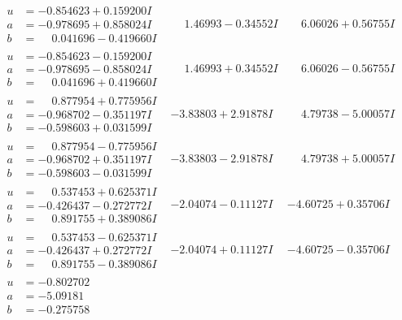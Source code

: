 \documentclass[1p]{elsarticle_modified}
\theoremstyle{definition}
\begin{document}
$$\begin{array}{c|c|c}
\begin{aligned}
u &= -0.854623 + 0.159200 I \\
a &= -0.978695 + 0.858024 I \\
b &= \phantom{-}0.041696 - 0.419660 I\end{aligned}
 & \phantom{-}1.46993 - 0.34552 I & \phantom{-}6.06026 + 0.56755 I \\ \hline\begin{aligned}
u &= -0.854623 - 0.159200 I \\
a &= -0.978695 - 0.858024 I \\
b &= \phantom{-}0.041696 + 0.419660 I\end{aligned}
 & \phantom{-}1.46993 + 0.34552 I & \phantom{-}6.06026 - 0.56755 I \\ \hline\begin{aligned}
u &= \phantom{-}0.877954 + 0.775956 I \\
a &= -0.968702 - 0.351197 I \\
b &= -0.598603 + 0.031599 I\end{aligned}
 & -3.83803 + 2.91878 I & \phantom{-}4.79738 - 5.00057 I \\ \hline\begin{aligned}
u &= \phantom{-}0.877954 - 0.775956 I \\
a &= -0.968702 + 0.351197 I \\
b &= -0.598603 - 0.031599 I\end{aligned}
 & -3.83803 - 2.91878 I & \phantom{-}4.79738 + 5.00057 I \\ \hline\begin{aligned}
u &= \phantom{-}0.537453 + 0.625371 I \\
a &= -0.426437 - 0.272772 I \\
b &= \phantom{-}0.891755 + 0.389086 I\end{aligned}
 & -2.04074 - 0.11127 I & -4.60725 + 0.35706 I \\ \hline\begin{aligned}
u &= \phantom{-}0.537453 - 0.625371 I \\
a &= -0.426437 + 0.272772 I \\
b &= \phantom{-}0.891755 - 0.389086 I\end{aligned}
 & -2.04074 + 0.11127 I & -4.60725 - 0.35706 I \\ \hline\begin{aligned}
u &= -0.802702\phantom{ +0.000000I} \\
a &= -5.09181\phantom{ +0.000000I} \\
b &= -0.275758\phantom{ +0.000000I}\end{aligned}

\end{array}$$
\end{document}

